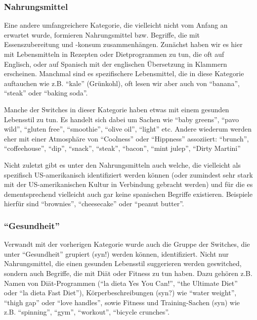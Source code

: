 \subsubsection{Nahrungsmittel}
Eine andere umfangreichere Kategorie, die vielleicht nicht vom Anfang an erwartet wurde, formieren Nahrungsmittel bzw. Begriffe, die mit Essenszubereitung und -konsum zusammenhängen.
Zunächst haben wir es hier mit Lebensmitteln in Rezepten oder Dietprogrammen zu tun, die oft auf Englisch, oder auf Spanisch mit der englischen Übersetzung in Klammern erscheinen.
Manchmal sind es spezifischere Lebensmittel, die in diese Kategorie auftauchen wie z.B. ``kale'' (Grünkohl), oft lesen wir aber auch von ``banana'', ``steak'' oder ``baking soda''.

Manche der Switches in dieser Kategorie haben etwas mit einem gesunden Lebensstil zu tun.
Es handelt sich dabei um Sachen wie ``baby greens'', ``pavo wild'', ``gluten free'', ``smoothie'', ``olive oil'', ``light'' etc.
Andere wiederum werden eher mit einer Atmosphäre von ``Coolness'' oder ``Hippness'' assoziiert:
``brunch'', ``coffeehouse'', ``dip'', ``snack'', ``steak'', ``bacon'', ``mint julep'', ``Dirty Martini''

Nicht zuletzt gibt es unter den Nahrungsmitteln auch welche, die vielleicht als spezifisch US-amerikanisch identifiziert werden können (oder zumindest sehr stark mit der US-amerikanischen Kultur in Verbindung gebracht werden) und für die es dementsprechend vielleicht auch gar keine spanischen Begriffe existieren.
Beispiele hierfür sind ``brownies'', ``cheesecake'' oder ``peanut butter''.

\subsubsection{``Gesundheit''}
Verwandt mit der vorherigen Kategorie wurde auch die Gruppe der Switches, die unter ``Gesundheit'' grupiert (syn!) werden können, identifiziert.
Nicht nur Nahrungsmittel, die einen gesunden Lebensstil suggerieren werden geswitched, sondern auch Begriffe, die mit Diät oder Fitness zu tun haben.
Dazu gehören z.B. Namen von Diät-Programmen (``la dieta Yes You Can!'', ``the Ultimate Diet'' oder ``la dieta Fast Diet''),
Körperbeschreibungen (syn?) wie ``water weight'', ``thigh gap'' oder ``love handles'',
sowie Fitness und Training-Sachen (syn) wie z.B. ``spinning'', ``gym'', ``workout'', ``bicycle crunches''.

